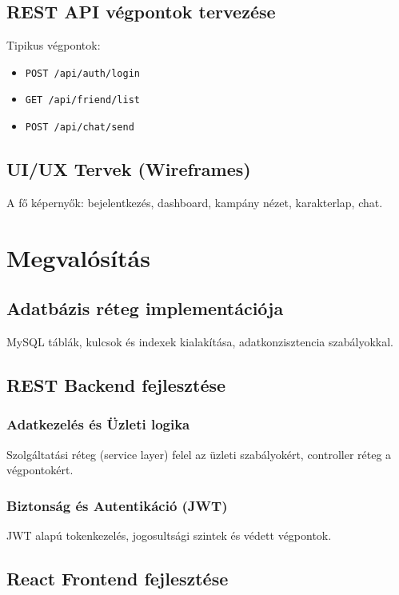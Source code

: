 \documentclass[colorlinks]{thesis-kando}
\theoremstyle{definition}
\theoremstyle{remark}
\begin{document}
	\section{REST API végpontok tervezése}
	Tipikus végpontok:
	\begin{itemize}
		\item \texttt{POST /api/auth/login}
		\item \texttt{GET /api/friend/list}
		\item \texttt{POST /api/chat/send}
	\end{itemize}
	
	\section{UI/UX Tervek (Wireframes)}
	A fő képernyők: bejelentkezés, dashboard, kampány nézet, karakterlap, chat.
	
	\chapter{Megvalósítás}
	
	\section{Adatbázis réteg implementációja}
	MySQL táblák, kulcsok és indexek kialakítása, adatkonzisztencia szabályokkal.
	
	\section{REST Backend fejlesztése}
	\subsection{Adatkezelés és Üzleti logika}
	Szolgáltatási réteg (service layer) felel az üzleti szabályokért, controller réteg a végpontokért.
	
	\subsection{Biztonság és Autentikáció (JWT)}
	JWT alapú tokenkezelés, jogosultsági szintek és védett végpontok.
	
	\section{React Frontend fejlesztése}
\end{document}
